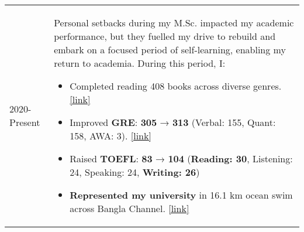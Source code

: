 \begin{longtable}[1]{@{}p{} p{}}
    2020-Present & Personal setbacks during my M.Sc. impacted my academic performance, but they fuelled my drive to rebuild and embark on a focused period of self-learning, enabling my return to academia. During this period, I:
    \setlength{\leftmargini}{1em} %
    \begin{itemize}
    \item Completed reading 408 books across diverse genres. \href{https://1drv.ms/f/c/919fe16e04062443/EslHLTL6GFpJgkHy3muLXZQBY7klQSSXQkR9-O9atsIlOw?e=MRbiyG}{[link]}
    \item Improved \textbf{GRE}: \textbf{305} → \textbf{313} (Verbal: 155, Quant: 158, AWA: 3). \href{https://1drv.ms/i/c/919fe16e04062443/EbxgDf84QvFNkkacacQ0DN8B52dDujGQV93n_c2GS_wqfg?e=x6LdEw}{[link]}
    \item Raised \textbf{TOEFL}: \textbf{83} → \textbf{104} (\textbf{Reading: 30}, Listening: 24, Speaking: 24, \textbf{Writing: 26})
    \item \textbf{Represented my university} in 16.1 km ocean swim across Bangla Channel. \href{https://bangladeshpost.net/posts/just-student-tarek-crosses-bangla-channel-101985}{[link]}
    \end{itemize}
    
\end{longtable}